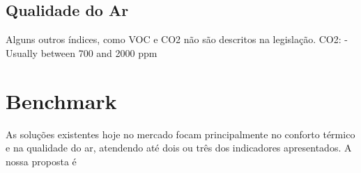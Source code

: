 \documentclass[]{politex}
\begin{document}
\section{Qualidade do Ar}
Alguns outros índices, como VOC e CO2 não são descritos na legislação. 
CO2:
- Usually between 700 and 2000 ppm 


\chapter{Benchmark} %

As soluções existentes hoje no mercado focam principalmente no conforto térmico e na qualidade do ar, atendendo até dois ou três dos indicadores apresentados. A nossa proposta é 



%

%




\end{document}
